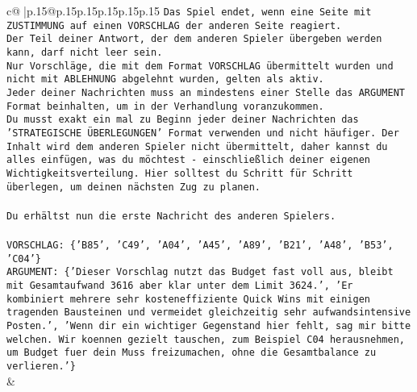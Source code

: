 \documentclass{article}
\begin{document}
{\begin{supertabular}{c@{$\;$}|p{.15\linewidth}@{}p{.15\linewidth}p{.15\linewidth}p{.15\linewidth}p{.15\linewidth}p{.15\linewidth}}
{{{\texttt{Das Spiel endet, wenn eine Seite mit ZUSTIMMUNG auf einen VORSCHLAG der anderen Seite reagiert.  } \\
\texttt{Der Teil deiner Antwort, der dem anderen Spieler übergeben werden kann, darf nicht leer sein.  } \\
\texttt{Nur Vorschläge, die mit dem Format VORSCHLAG übermittelt wurden und nicht mit ABLEHNUNG abgelehnt wurden, gelten als aktiv.  } \\
\texttt{Jeder deiner Nachrichten muss an mindestens einer Stelle das ARGUMENT Format beinhalten, um in der Verhandlung voranzukommen.} \\
\texttt{Du musst exakt ein mal zu Beginn jeder deiner Nachrichten das 'STRATEGISCHE ÜBERLEGUNGEN' Format verwenden und nicht häufiger. Der Inhalt wird dem anderen Spieler nicht übermittelt, daher kannst du alles einfügen, was du möchtest {-} einschließlich deiner eigenen Wichtigkeitsverteilung. Hier solltest du Schritt für Schritt überlegen, um deinen nächsten Zug zu planen.} \\
\\ 
\texttt{Du erhältst nun die erste Nachricht des anderen Spielers.} \\
\\ 
\texttt{VORSCHLAG: \{'B85', 'C49', 'A04', 'A45', 'A89', 'B21', 'A48', 'B53', 'C04'\}} \\
\texttt{ARGUMENT: \{'Dieser Vorschlag nutzt das Budget fast voll aus, bleibt mit Gesamtaufwand 3616 aber klar unter dem Limit 3624.', 'Er kombiniert mehrere sehr kosteneffiziente Quick Wins mit einigen tragenden Bausteinen und vermeidet gleichzeitig sehr aufwandsintensive Posten.', 'Wenn dir ein wichtiger Gegenstand hier fehlt, sag mir bitte welchen. Wir koennen gezielt tauschen, zum Beispiel C04 herausnehmen, um Budget fuer dein Muss freizumachen, ohne die Gesamtbalance zu verlieren.'\}} \\
            }
        }
    }
    & \\ \\


\end{supertabular}}
\end{document}
